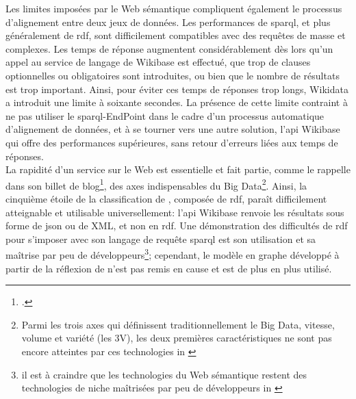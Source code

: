 Les limites imposées par le Web sémantique compliquent également le processus d'alignement entre deux jeux de données. Les performances de \ac{sparql}, et plus généralement de \ac{rdf}, sont difficilement compatibles avec des requêtes de masse et complexes. Les temps de réponse augmentent considérablement dès lors qu'un appel au service de langage de Wikibase est effectué, que trop de clauses optionnelles ou obligatoires sont introduites, ou bien que le nombre de résultats est trop important. Ainsi, pour éviter ces temps de réponses trop longs, Wikidata a introduit une limite à soixante secondes. La présence de cette limite contraint à ne pas utiliser le \ac{sparql}-EndPoint dans le cadre d'un processus automatique d'alignement de données, et à se tourner vers une autre solution, l'\ac{api} Wikibase qui offre des performances supérieures, sans retour d'erreurs liées aux temps de réponses.\\

La rapidité d'un service sur le Web est essentielle et fait partie, comme le rappelle  dans son billet de blog\footcite{poupeau_au-a_2018}, des axes indispensables du Big Data\footnote{\og Parmi les trois axes qui définissent traditionnellement le Big Data, vitesse, volume et variété (les \og 3V\fg{}), les deux premières caractéristiques ne sont pas encore atteintes par ces technologies\fg{} in \cite{poupeau_au-a_2018}}. Ainsi, la cinquième étoile de la classification de , composée de \ac{rdf}, paraît difficilement atteignable et utilisable universellement: l'\ac{api} Wikibase renvoie les résultats sous forme de \ac{json} ou de XML, et non en \ac{rdf}. Une démonstration des difficultés de \ac{rdf} pour s'imposer avec son langage de requête \ac{sparql} est son utilisation et sa maîtrise par peu de développeurs\footnote{\og il est à craindre que les technologies du Web sémantique restent des technologies de niche maîtrisées par peu de développeurs\fg{} in \cite{poupeau_au-a_2018}}; cependant, le modèle en graphe développé à partir de la réflexion de  n'est pas remis en cause et est de plus en plus utilisé.\\

